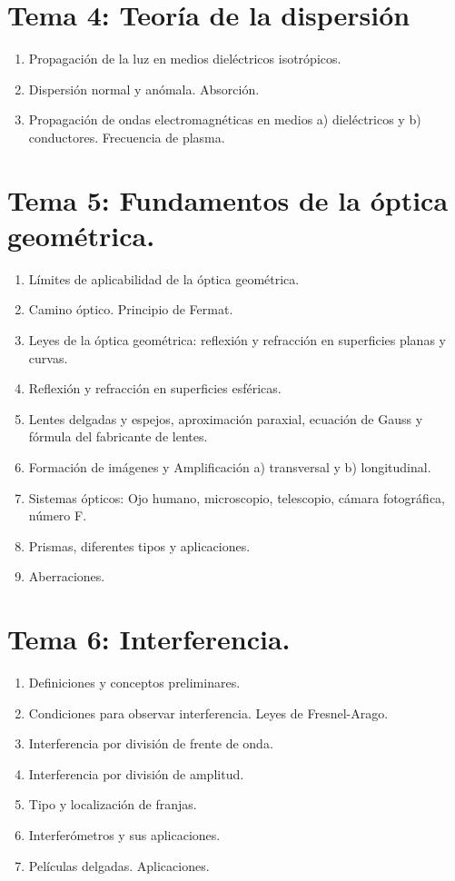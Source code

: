\section{Tema 4: Teoría de la dispersión}
\begin{enumerate}
\item Propagación de la luz en medios dieléctricos isotrópicos.
\item Dispersión normal y anómala. Absorción.
\item Propagación de ondas electromagnéticas en medios a) dieléctricos y b) conductores. Frecuencia de plasma.
\end{enumerate}

\section{Tema 5: Fundamentos de la óptica geométrica.}
\begin{enumerate}
\item Límites de aplicabilidad de la óptica geométrica.
\item Camino óptico. Principio de Fermat.
\item Leyes de la óptica geométrica: reflexión y refracción en superficies planas y curvas.
\item Reflexión y refracción en superficies esféricas.
\item Lentes delgadas y espejos, aproximación paraxial, ecuación de Gauss y fórmula del fabricante de lentes.
\item Formación de imágenes y Amplificación a) transversal y b) longitudinal.
\item Sistemas ópticos: Ojo humano, microscopio, telescopio, cámara fotográfica, número F.
\item Prismas, diferentes tipos y aplicaciones.
\item Aberraciones.
\end{enumerate}

\section{Tema 6: Interferencia.}
\begin{enumerate}
\item Definiciones y conceptos preliminares.
\item Condiciones para observar interferencia. Leyes de Fresnel-Arago.
\item Interferencia por división de frente de onda.
\item Interferencia por división de amplitud.
\item Tipo y localización de franjas.
\item Interferómetros y sus aplicaciones.
\item Películas delgadas. Aplicaciones.
\end{enumerate}

